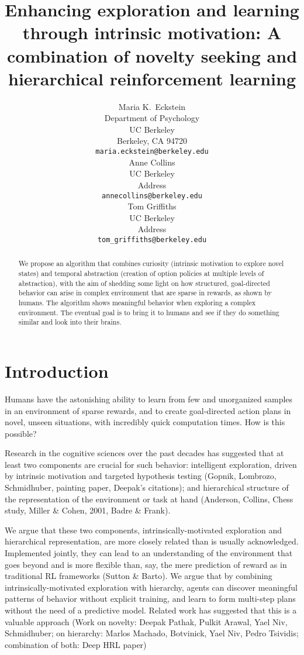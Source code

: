 \documentclass{article}
\title{Enhancing exploration and learning through intrinsic motivation: A combination of novelty seeking and hierarchical reinforcement learning}
\author{
  Maria K.~Eckstein \\
  Department of Psychology \\
  UC Berkeley \\
  Berkeley, CA 94720 \\
  \texttt{maria.eckstein@berkeley.edu} \\  
  \And
  Anne Collins \\
  UC Berkeley \\
  Address \\
  \texttt{annecollins@berkeley.edu} \\
  \And
  Tom Griffiths \\
  UC Berkeley \\
  Address \\
  \texttt{tom_griffiths@berkeley.edu} \\
}
\begin{document}
\maketitle

\begin{abstract}
  We propose an algorithm that combines curiosity (intrinsic motivation to explore novel states) and temporal abstraction (creation of option policies at multiple levels of abstraction), with the aim of shedding some light on how structured, goal-directed behavior can arise in complex environment that are sparse in rewards, as shown by humans. The algorithm shows meaningful behavior when exploring a complex environment. The eventual goal is to bring it to humans and see if they do something similar and look into their brains.
\end{abstract}


\section{Introduction}

Humans have the astonishing ability to learn from few and unorganized samples in an environment of sparse rewards, and to create goal-directed action plans in novel, unseen situations, with incredibly quick computation times. How is this possible?

Research in the cognitive sciences over the past decades has suggested that at least two components are crucial for such behavior: intelligent exploration, driven by intrinsic motivation and targeted hypothesis testing (Gopnik, Lombrozo, Schmidhuber, painting paper, Deepak's citations); and hierarchical structure of the representation of the environment or task at hand (Anderson, Collins, Chess study, Miller \& Cohen, 2001, Badre \& Frank).

We argue that these two components, intrinsically-motivated exploration and hierarchical representation, are more closely related than is usually acknowledged. Implemented jointly, they can lead to an understanding of the environment that goes beyond and is more flexible than, say, the mere prediction of reward as in traditional RL frameworks (Sutton \& Barto). We argue that by combining intrinsically-motivated exploration with hierarchy, agents can discover meaningful patterns of behavior without explicit training, and learn to form multi-step plans without the need of a predictive model. Related work has suggested that this is a valuable approach (Work on novelty: Deepak Pathak, Pulkit Arawal, Yael Niv, Schmidhuber; on hierarchy: Marlos Machado, Botvinick, Yael Niv, Pedro Tsividis; combination of both: Deep HRL paper)
\end{document}
